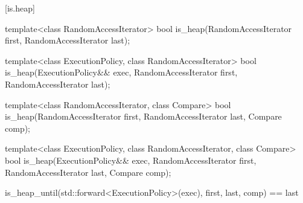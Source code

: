 [is.heap]{}

%
\begin{itemdecl}
template<class RandomAccessIterator>
  bool is_heap(RandomAccessIterator first, RandomAccessIterator last);
\end{itemdecl}

\begin{itemdescr}
\pnum
\returns {}
\end{itemdescr}


%
\begin{itemdecl}
template<class ExecutionPolicy, class RandomAccessIterator>
  bool is_heap(ExecutionPolicy&& exec,
               RandomAccessIterator first, RandomAccessIterator last);
\end{itemdecl}

\begin{itemdescr}
\pnum
\returns {}
\end{itemdescr}


%
\begin{itemdecl}
template<class RandomAccessIterator, class Compare>
  bool is_heap(RandomAccessIterator first, RandomAccessIterator last, Compare comp);
\end{itemdecl}

\begin{itemdescr}
\pnum
\returns {}
\end{itemdescr}


%
\begin{itemdecl}
template<class ExecutionPolicy, class RandomAccessIterator, class Compare>
  bool is_heap(ExecutionPolicy&& exec,
               RandomAccessIterator first, RandomAccessIterator last, Compare comp);
\end{itemdecl}

\begin{itemdescr}
\pnum
\returns
\begin{codeblock}
is_heap_until(std::forward<ExecutionPolicy>(exec), first, last, comp) == last
\end{codeblock}
\end{itemdescr}


